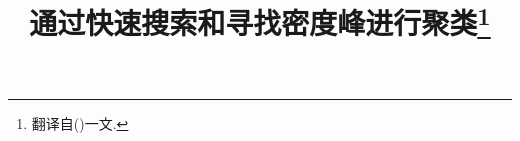 \documentclass[10pt, twocolumn]{ctexart}
\title{通过快速搜索和寻找密度峰进行聚类\footnote{翻译自()一文. }}
\author{}
\date{}
\begin{document}
    \begin{titlepage}
        \maketitle
    \end{titlepage}











\end{document}
